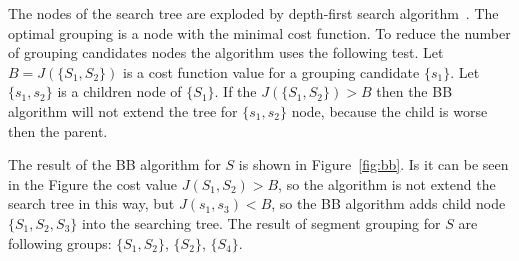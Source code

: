 \documentclass{lutmscthesis}[2010/09/22]
\begin{document}
\begin{figure}[htp]
\end{figure}



The nodes of the search tree are exploded by depth-first search algorithm~\cite{zafari-bb}. The optimal grouping is a node with the minimal cost function. To reduce the number of grouping candidates nodes the algorithm uses the following test. Let $B = J(\{S_1,S_2\})$ is a cost function value for a grouping candidate $\{s_1\}$.  Let $\{s_1,s_2\}$ is a children node of $\{S_1\}$. If the $J(\{S_1,S_2\})>B$ then the BB algorithm will not extend the tree for $\{s_1,s_2\}$ node, because the child is worse then the parent.

The result of the BB algorithm for $S$ is shown in Figure~\ref{fig:bb}. Is it can be seen in the Figure the cost value $J(S_1,S_2)>B$, so the algorithm is not extend the search tree in this way, but $J(s_1,s_3)<B$, so the BB algorithm adds child node $\{S_1,S_2,S_3\}$ into the searching tree. The result of segment grouping for $S$ are following groups: $\{S_1,S_2\}$, $\{S_2\}$, $\{S_4\}$. 


\begin{figure}[htp]
\end{figure}
\end{document}
